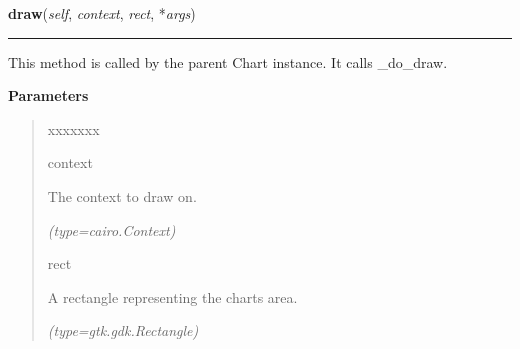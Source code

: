 \hspace{.8\funcindent}\begin{boxedminipage}{\funcwidth}

    \raggedright \textbf{draw}(\textit{self}, \textit{context}, \textit{rect}, *\textit{args})

    \vspace{-1.5ex}

    \rule{\textwidth}{0.5\fboxrule}
\setlength{\parskip}{2ex}
    This method is called by the parent Chart instance. It calls 
    \_do\_draw.

\setlength{\parskip}{1ex}
      \textbf{Parameters}
      \vspace{-1ex}

      \begin{quote}
        \begin{Ventry}{xxxxxxx}

          \item[context]

          The context to draw on.

            {\it (type=cairo.Context)}

          \item[rect]

          A rectangle representing the charts area.

            {\it (type=gtk.gdk.Rectangle)}

        \end{Ventry}

      \end{quote}

    \end{boxedminipage}

    \label{pygtk_chart:chart_object:ChartObject:set_antialias}

    \vspace{0.5ex}

